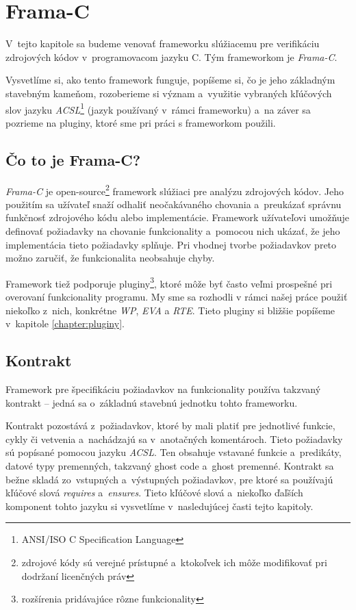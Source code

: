 \chapter{Frama-C} 

V~tejto kapitole sa budeme venovať frameworku slúžiacemu pre verifikáciu zdrojových kódov v~programovacom jazyku C. Tým frameworkom je \emph{Frama-C}.

Vysvetlíme si, ako tento framework funguje, popíšeme si, čo je jeho základným stavebným kameňom, rozoberieme si význam a~využitie vybraných kľúčových slov jazyku \emph{ACSL}\footnote{ANSI/ISO C Specification Language} (jazyk používaný v~rámci frameworku) a~na záver sa pozrieme na pluginy, ktoré sme pri práci s frameworkom použili.

\section{Čo to je Frama-C?} \label{frama-c_uvod}

\emph{Frama-C} je open-source\footnote{zdrojové kódy sú verejné prístupné a~ktokoľvek ich môže modifikovať pri dodržaní licenčných práv} framework slúžiaci pre analýzu zdrojových kódov. Jeho použitím sa užívateľ snaží odhaliť neočakávaného chovania a~preukázať správnu funkčnosť zdrojového kódu alebo implementácie. Framework užívateľovi umožňuje definovať požiadavky na chovanie funkcionality a~pomocou nich ukázať, že jeho implementácia tieto požiadavky splňuje. Pri vhodnej tvorbe požiadavkov preto možno zaručiť, že funkcionalita neobsahuje chyby.\cite{frama-c-uvod}

Framework tiež podporuje pluginy\footnote{rozšírenia pridávajúce rôzne funkcionality}, ktoré môže byť často veľmi prospešné pri overovaní funkcionality programu. My sme sa rozhodli v rámci našej práce použiť niekoľko z~nich, konkrétne \emph{WP}, \emph{EVA} a \emph{RTE}. Tieto pluginy si bližšie popíšeme v~kapitole \ref{chapter:pluginy}.

\section{Kontrakt}

Framework pre špecifikáciu požiadavkov na funkcionality používa takzvaný kontrakt -- jedná sa o~základnú stavebnú jednotku tohto frameworku.

Kontrakt pozostává z~požiadavkov, ktoré by mali platiť pre jednotlivé funkcie, cykly či vetvenia a~nachádzajú sa v~anotačných komentároch. Tieto požiadavky sú popísané pomocou jazyku \emph{ACSL}. Ten obsahuje vstavané funkcie a~predikáty, datové typy premenných, takzvaný ghost code a~ghost premenné. \cite{obsah-acsl} Kontrakt sa bežne skladá zo~vstupných a~výstupných požiadavkov, pre ktoré sa používajú kľúčové slová \emph{requires} a~\emph{ensures}. Tieto kľúčové slová a~niekoľko ďaľších komponent tohto jazyku si vysvetlíme v~nasledujúcej časti tejto kapitoly.

